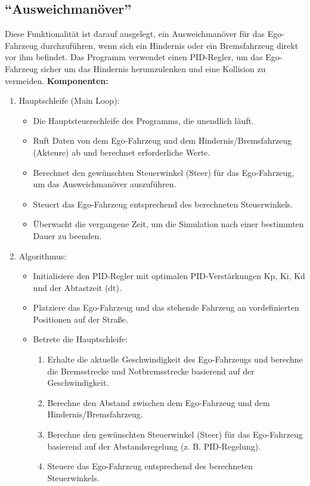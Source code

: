 \subsection{\enquote{Ausweichmanöver}}
Diese Funktionalität ist darauf ausgelegt, ein Ausweichmanöver für das Ego-Fahrzeug durchzuführen, wenn sich ein Hindernis oder ein Bremsfahrzeug direkt vor ihm befindet. Das Programm verwendet einen PID-Regler, um das Ego-Fahrzeug sicher um das Hindernis herumzulenken und eine Kollision zu vermeiden. \newline
\textbf{Komponenten:}
\begin{enumerate}
	\item Hauptschleife (Main Loop):
	\begin{itemize}
		\item Die Hauptsteuerschleife des Programms, die unendlich läuft.
		\item Ruft Daten von dem Ego-Fahrzeug und dem Hindernis/Bremsfahrzeug (Akteure) ab und berechnet erforderliche Werte.
		\item Berechnet den gewünschten Steuerwinkel (Steer) für das Ego-Fahrzeug, um das Ausweichmanöver auszuführen.
		\item Steuert das Ego-Fahrzeug entsprechend des berechneten Steuerwinkels.
		\item Überwacht die vergangene Zeit, um die Simulation nach einer bestimmten Dauer zu beenden.
	\end{itemize}
	\item Algorithmus:
	\begin{itemize}
		\item Initialisiere den PID-Regler mit optimalen PID-Verstärkungen Kp, Ki, Kd und der Abtastzeit (dt).
		\item Platziere das Ego-Fahrzeug und das stehende Fahrzeug an vordefinierten Positionen auf der Straße.
		\item Betrete die Hauptschleife:
		\begin{enumerate}
			\item Erhalte die aktuelle Geschwindigkeit des Ego-Fahrzeugs und berechne die Bremsstrecke und Notbremsstrecke basierend auf der Geschwindigkeit.
			\item Berechne den Abstand zwischen dem Ego-Fahrzeug und dem Hindernis/Bremsfahrzeug.
			\item Berechne den gewünschten Steuerwinkel (Steer) für das Ego-Fahrzeug basierend auf der Abstandsregelung (z. B. PID-Regelung).
			\item Steuere das Ego-Fahrzeug entsprechend des berechneten Steuerwinkels.

\end{enumerate}
\end{itemize}
\end{enumerate}
